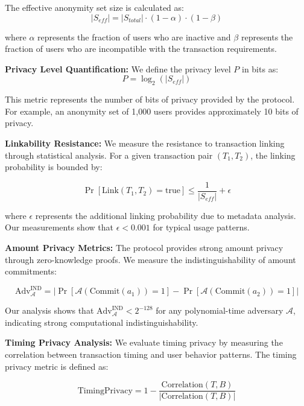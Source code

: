 \documentclass[11pt,a4paper]{article}
\begin{document}
The effective anonymity set size is calculated as:
\begin{equation}
|S_{eff}| = |S_{total}| \cdot (1 - \alpha) \cdot (1 - \beta)
\end{equation}

where $\alpha$ represents the fraction of users who are inactive and $\beta$ represents the fraction of users who are incompatible with the transaction requirements.

\textbf{Privacy Level Quantification:}
We define the privacy level $P$ in bits as:
\begin{equation}
P = \log_2(|S_{eff}|)
\end{equation}

This metric represents the number of bits of privacy provided by the protocol. For example, an anonymity set of 1,000 users provides approximately 10 bits of privacy.

\textbf{Linkability Resistance:}
We measure the resistance to transaction linking through statistical analysis. For a given transaction pair $(T_1, T_2)$, the linking probability is bounded by:

\begin{equation}
\Pr[\text{Link}(T_1, T_2) = \text{true}] \leq \frac{1}{|S_{eff}|} + \epsilon
\end{equation}

where $\epsilon$ represents the additional linking probability due to metadata analysis. Our measurements show that $\epsilon < 0.001$ for typical usage patterns.

\textbf{Amount Privacy Metrics:}
The protocol provides strong amount privacy through zero-knowledge proofs. We measure the indistinguishability of amount commitments:

\begin{equation}
\text{Adv}_{\mathcal{A}}^{\text{IND}} = |\Pr[\mathcal{A}(\text{Commit}(a_1)) = 1] - \Pr[\mathcal{A}(\text{Commit}(a_2)) = 1]|
\end{equation}

Our analysis shows that $\text{Adv}_{\mathcal{A}}^{\text{IND}} < 2^{-128}$ for any polynomial-time adversary $\mathcal{A}$, indicating strong computational indistinguishability.

\textbf{Timing Privacy Analysis:}
We evaluate timing privacy by measuring the correlation between transaction timing and user behavior patterns. The timing privacy metric is defined as:

\begin{equation}
\text{TimingPrivacy} = 1 - \frac{\text{Correlation}(T, B)}{|\text{Correlation}(T, B)|}
\end{equation}
\end{document}
